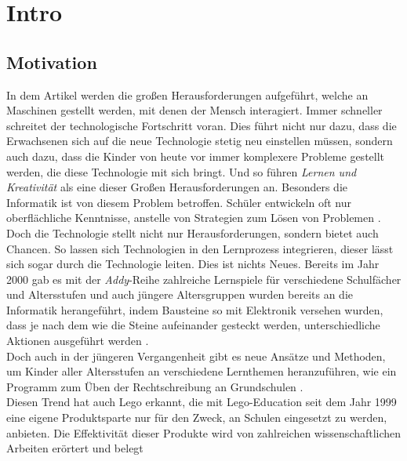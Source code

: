 \chapter{Intro}


\section{Motivation}

In dem Artikel  werden die großen Herausforderungen aufgeführt, welche an Maschinen gestellt werden, mit denen der Mensch interagiert. Immer schneller schreitet der technologische Fortschritt voran. Dies führt nicht nur dazu, dass die Erwachsenen sich auf die neue Technologie stetig neu einstellen müssen, sondern auch dazu, dass die Kinder von heute vor immer komplexere Probleme gestellt werden, die diese Technologie mit sich bringt. Und so führen \citeauthor{stephanidis_seven_2019} \textit{Lernen und Kreativität} als eine dieser Großen Herausforderungen an. Besonders die Informatik ist von diesem Problem betroffen. Schüler entwickeln oft nur oberflächliche Kenntnisse, anstelle von Strategien zum Lösen von Problemen \cite{kazimoglu_serious_2012}.\\
Doch die Technologie stellt nicht nur Herausforderungen, sondern bietet auch Chancen. So lassen sich Technologien in den Lernprozess integrieren, dieser lässt sich sogar durch die Technologie leiten. Dies ist nichts Neues. Bereits im Jahr 2000 gab es mit der \textit{Addy}-Reihe zahlreiche Lernspiele für verschiedene Schulfächer und Altersstufen \cite{addy} und auch jüngere Altersgruppen wurden bereits an die Informatik herangeführt, indem Bausteine so mit Elektronik versehen wurden, dass je nach dem wie die Steine aufeinander gesteckt werden, unterschiedliche Aktionen ausgeführt werden \cite{wyeth_tangible_2002}. \\
Doch auch in der jüngeren Vergangenheit gibt es neue Ansätze und Methoden, um Kinder aller Altersstufen an verschiedene Lernthemen heranzuführen, wie ein Programm zum Üben der Rechtschreibung an Grundschulen \cite{berkling_learning_2020}.\\
Diesen Trend hat auch \gls{Lego} erkannt, die mit \gls{Lego}-Education seit dem Jahr 1999 eine eigene Produktsparte nur für den Zweck, an Schulen eingesetzt zu werden, anbieten. Die Effektivität dieser Produkte wird von zahlreichen wissenschaftlichen Arbeiten erörtert und belegt \cite{perez_new_2015, karatrantou_algorithm_2008, jun_design_2016, cuellar_design_2014, klassner_lego_2003}\\
